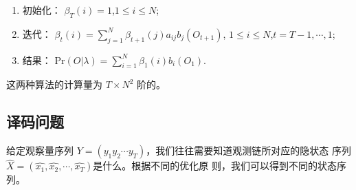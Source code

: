 \vspace*{\baselineskip} 
\begin{enumerate}
   \item  初始化： $\beta_{T}(i)=1$,\quad $1\leq i \leq N$;\\
   \item  迭代： $\beta_{t}(i)=\sum\limits_{j=1}^{N}\beta_{t+1}(j)a_{ij}b_{j}(O_{t+1})$,
                  \quad $1\leq i\leq N$,$t=T-1,\cdots,1$;\\
   \item   结果： $\mbox{Pr}(O |\lambda)=\sum\limits_{i=1}^{N}\beta_{1}(i)b_{i}(O_{1})$.\\
\end{enumerate}
 这两种算法的计算量为 $T\times N^2$  阶的。

\subsection{译码问题}
给定观察量序列 $Y=(y_{1}y_{2}\cdots
y_{T})$，我们往往需要知道观测链所对应的隐状态
序列$\hat{X}=(\hat{x_{1}}, \hat{x_2},\cdots,\hat{x_T})$是什么。根据不同的优化原
则，我们可以得到不同的状态序列。
